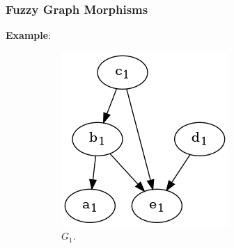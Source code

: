 \begin{frame}
	\frametitle{Fuzzy Graph Morphisms}

	\textbf{Example}:
	\begin{figure}[htbp]
		\centering
		\begin{subfigure}[t]{0.26\textwidth}
			\centering
			\includegraphics[width=\linewidth,valign=t]{inc/fuzzy_graph_theory/fuzzy_graph_morphism_G1.png}
			\caption{$G_1$.}
		\end{subfigure}
		\quad
		\begin{subfigure}[t]{0.19\textwidth}
			\centering

\end{subfigure}
\end{figure}
\end{frame}

